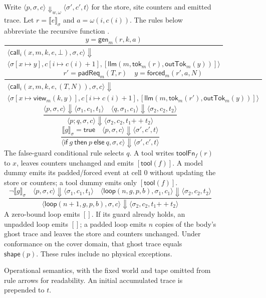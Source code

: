 \begin{figure}[p]
\small
Write $\langle p,\sigma,c\rangle\Downarrow_{w,\omega}
\langle\sigma',c',t\rangle$ for the store, site counters and emitted trace.
Let $r=\llbracket e\rrbracket_\sigma$ and $a=\omega(i,c(i))$.
The rules below abbreviate the recursive function .
\[
\frac{y=\mathsf{gen}_m(r,k,a)}
 {\begin{gathered}\langle\mathsf{call}_i(x,m,k,e,\bot),\sigma,c\rangle\Downarrow\\
  \langle\sigma[x\mapsto y],c[i\mapsto c(i)+1],
  [\mathsf{llm}(m,\mathsf{tok}_m(r),\mathsf{outTok}_m(y))]\rangle\end{gathered}}
\]
\[
\frac{r'=\mathsf{padReq}_m(T,r)\quad y=\mathsf{forced}_m(r',a,N)}
 {\begin{gathered}\langle\mathsf{call}_i(x,m,k,e,(T,N)),\sigma,c\rangle\Downarrow\\
  \langle\sigma[x\mapsto\mathsf{view}_m(k,y)],c[i\mapsto c(i)+1],
  [\mathsf{llm}(m,\mathsf{tok}_m(r'),\mathsf{outTok}_m(y))]\rangle\end{gathered}}
\]
\[
\frac{\langle p,\sigma,c\rangle\Downarrow\langle\sigma_1,c_1,t_1\rangle
 \quad\langle q,\sigma_1,c_1\rangle\Downarrow\langle\sigma_2,c_2,t_2\rangle}
 {\langle p;q,\sigma,c\rangle\Downarrow\langle\sigma_2,c_2,t_1{+\!+}t_2\rangle}
\]
\[
\frac{\llbracket g\rrbracket_\sigma=\mathsf{true}\quad
       \langle p,\sigma,c\rangle\Downarrow\langle\sigma',c',t\rangle}
 {\langle\mathsf{if}\ g\ \mathsf{then}\ p\ \mathsf{else}\ q,\sigma,c\rangle
       \Downarrow\langle\sigma',c',t\rangle}
\]
The false-guard conditional rule selects $q$. A tool writes
$\mathsf{toolFn}_f(r)$ to $x$, leaves counters unchanged and emits $[\mathsf{tool}(f)]$.
A model dummy emits its padded/forced event at cell $0$ without updating the
store or counters; a tool dummy emits only $[\mathsf{tool}(f)]$.
\[
\frac{\neg\llbracket g\rrbracket_\sigma\quad
 \langle p,\sigma,c\rangle\Downarrow\langle\sigma_1,c_1,t_1\rangle\quad
 \langle\mathsf{loop}(n,g,p,b),\sigma_1,c_1\rangle\Downarrow
       \langle\sigma_2,c_2,t_2\rangle}
 {\langle\mathsf{loop}(n+1,g,p,b),\sigma,c\rangle\Downarrow
       \langle\sigma_2,c_2,t_1{+\!+}t_2\rangle}
\]
A zero-bound loop emits $[]$. If its guard already holds, an unpadded loop emits
$[]$; a padded loop emits $n$ copies of the body's ghost trace and leaves the
store and counters unchanged. Under conformance on the cover domain, that ghost
trace equals $\mathsf{shape}(p)$. These rules include no physical exceptions.
\caption{Operational semantics, with the fixed world and tape omitted from rule
arrows for readability. An initial accumulated trace is prepended to $t$.}
\label{fig:semantics}
\end{figure}
